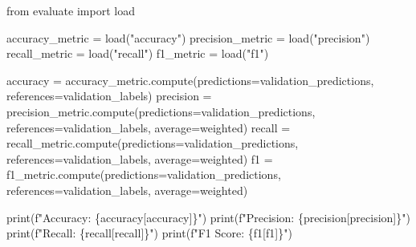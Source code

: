 \documentclass[
  letterpaper,
  DIV=11,
  numbers=noendperiod]{scrreprt}
\newenvironment{Shaded}{\begin{snugshade}}{\end{snugshade}}
\newcommand{\BuiltInTok}[1]{\textcolor[rgb]{0.00,0.23,0.31}{#1}}
\newcommand{\ImportTok}[1]{\textcolor[rgb]{0.00,0.46,0.62}{#1}}
\newcommand{\NormalTok}[1]{\textcolor[rgb]{0.00,0.23,0.31}{#1}}
\newcommand{\OperatorTok}[1]{\textcolor[rgb]{0.37,0.37,0.37}{#1}}
\newcommand{\SpecialCharTok}[1]{\textcolor[rgb]{0.37,0.37,0.37}{#1}}
\newcommand{\SpecialStringTok}[1]{\textcolor[rgb]{0.13,0.47,0.30}{#1}}
\newcommand{\StringTok}[1]{\textcolor[rgb]{0.13,0.47,0.30}{#1}}
\begin{document}
\begin{Shaded}
\begin{Highlighting}[]
\ImportTok{from}\NormalTok{ evaluate }\ImportTok{import}\NormalTok{ load}

\NormalTok{accuracy\_metric }\OperatorTok{=}\NormalTok{ load(}\StringTok{"accuracy"}\NormalTok{)}
\NormalTok{precision\_metric }\OperatorTok{=}\NormalTok{ load(}\StringTok{"precision"}\NormalTok{)}
\NormalTok{recall\_metric }\OperatorTok{=}\NormalTok{ load(}\StringTok{"recall"}\NormalTok{)}
\NormalTok{f1\_metric }\OperatorTok{=}\NormalTok{ load(}\StringTok{"f1"}\NormalTok{)}

\NormalTok{accuracy }\OperatorTok{=}\NormalTok{ accuracy\_metric.compute(predictions}\OperatorTok{=}\NormalTok{validation\_predictions, references}\OperatorTok{=}\NormalTok{validation\_labels)}
\NormalTok{precision }\OperatorTok{=}\NormalTok{ precision\_metric.compute(predictions}\OperatorTok{=}\NormalTok{validation\_predictions, references}\OperatorTok{=}\NormalTok{validation\_labels, average}\OperatorTok{=}\StringTok{\textquotesingle{}weighted\textquotesingle{}}\NormalTok{)}
\NormalTok{recall }\OperatorTok{=}\NormalTok{ recall\_metric.compute(predictions}\OperatorTok{=}\NormalTok{validation\_predictions, references}\OperatorTok{=}\NormalTok{validation\_labels, average}\OperatorTok{=}\StringTok{\textquotesingle{}weighted\textquotesingle{}}\NormalTok{)}
\NormalTok{f1 }\OperatorTok{=}\NormalTok{ f1\_metric.compute(predictions}\OperatorTok{=}\NormalTok{validation\_predictions, references}\OperatorTok{=}\NormalTok{validation\_labels, average}\OperatorTok{=}\StringTok{\textquotesingle{}weighted\textquotesingle{}}\NormalTok{)}

\BuiltInTok{print}\NormalTok{(}\SpecialStringTok{f"Accuracy: }\SpecialCharTok{\{}\NormalTok{accuracy[}\StringTok{\textquotesingle{}accuracy\textquotesingle{}}\NormalTok{]}\SpecialCharTok{\}}\SpecialStringTok{"}\NormalTok{)}
\BuiltInTok{print}\NormalTok{(}\SpecialStringTok{f"Precision: }\SpecialCharTok{\{}\NormalTok{precision[}\StringTok{\textquotesingle{}precision\textquotesingle{}}\NormalTok{]}\SpecialCharTok{\}}\SpecialStringTok{"}\NormalTok{)}
\BuiltInTok{print}\NormalTok{(}\SpecialStringTok{f"Recall: }\SpecialCharTok{\{}\NormalTok{recall[}\StringTok{\textquotesingle{}recall\textquotesingle{}}\NormalTok{]}\SpecialCharTok{\}}\SpecialStringTok{"}\NormalTok{)}
\BuiltInTok{print}\NormalTok{(}\SpecialStringTok{f"F1 Score: }\SpecialCharTok{\{}\NormalTok{f1[}\StringTok{\textquotesingle{}f1\textquotesingle{}}\NormalTok{]}\SpecialCharTok{\}}\SpecialStringTok{"}\NormalTok{)}
\end{Highlighting}
\end{Shaded}
\end{document}
